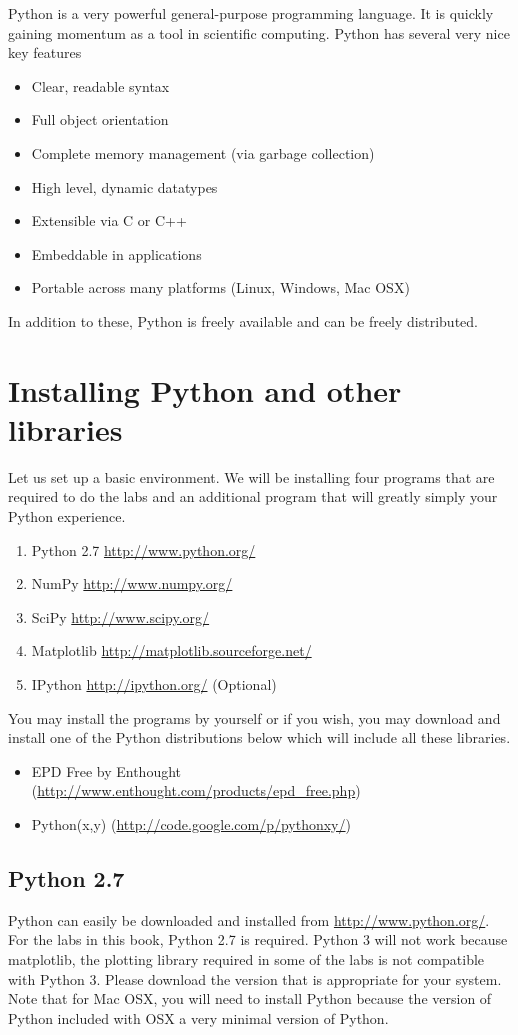 \label{lab:Essentials1}

Python is a very powerful general-purpose programming language.  It is quickly gaining momentum as a tool in scientific computing.  Python has several very nice key features
\begin{itemize}
\item Clear, readable syntax
\item Full object orientation
\item Complete memory management (via garbage collection)
\item High level, dynamic datatypes
\item Extensible via C or C++
\item Embeddable in applications
\item Portable across many platforms (Linux, Windows, Mac OSX)
\end{itemize}
In addition to these, Python is freely available and can be freely distributed.

\section*{Installing Python and other libraries}
Let us set up a basic environment.  We will be installing four programs that are required to do the labs and an additional program that will greatly simply your Python experience.
\begin{enumerate}
\item Python 2.7 \url{http://www.python.org/}
\item NumPy \url{http://www.numpy.org/}
\item SciPy \url{http://www.scipy.org/}
\item Matplotlib \url{http://matplotlib.sourceforge.net/}
\item IPython \url{http://ipython.org/} (Optional)
\end{enumerate}
You may install the programs by yourself or if you wish, you may download and install one of the Python distributions below which will include all these libraries.
\begin{itemize}
\item EPD Free by Enthought (\url{http://www.enthought.com/products/epd_free.php})
\item Python(x,y) (\url{http://code.google.com/p/pythonxy/})
\end{itemize}


\subsection*{Python 2.7}
Python can easily be downloaded and installed from \url{http://www.python.org/}.  For the labs in this book, Python 2.7 is required.  Python 3 will not work because matplotlib, the plotting library required in some of the labs is not compatible with Python 3.  Please download the version that is appropriate for your system.  Note that for Mac OSX, you will need to install Python because the version of Python included with OSX a very minimal version of Python.

